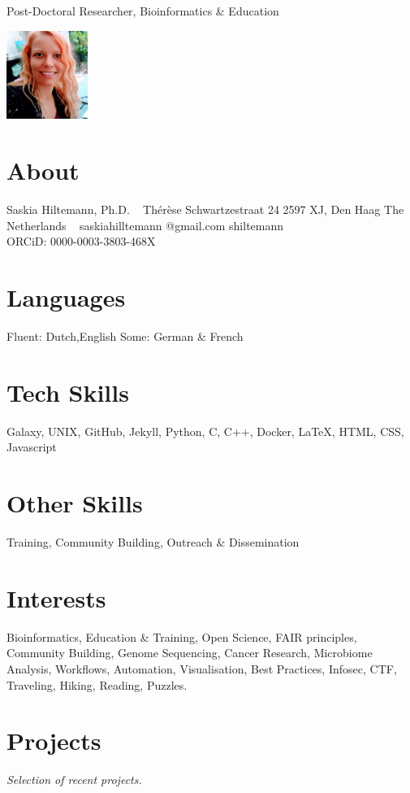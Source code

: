 \documentclass[]{shiltemann-cv}
\begin{document}
    {Post-Doctoral Researcher, Bioinformatics \& Education}


\begin{aside}
  \includegraphics[width=75pt]{photo-saskia.png}
  \section{About}
    Saskia Hiltemann, Ph.D.
    ~
    Thérèse Schwartzestraat 24
    2597 XJ, Den Haag
    The Netherlands
    ~
    saskiahilltemann @gmail.com \faEnvelope
    shiltemann \faGithub \ \faTwitter \ \faLinkedin
    \ \\
    ORCiD:
    0000-0003-3803-468X \faOrcid
  \section{Languages}
    Fluent: Dutch,English
    Some: German \& French
  \section{Tech Skills}
    Galaxy, UNIX, GitHub, Jekyll, Python, C, C++, Docker, LaTeX, HTML, CSS, Javascript
  \section{Other Skills}
    Training, Community Building, Outreach \& Dissemination
\end{aside}

\section{Interests}

Bioinformatics, Education \& Training, Open Science, FAIR principles, Community Building, Genome Sequencing, Cancer Research, Microbiome Analysis, Workflows, Automation, Visualisation, Best Practices, Infosec, CTF, Traveling, Hiking, Reading, Puzzles.


\section{Projects}
\emph{Selection of recent projects.}
\end{document}
